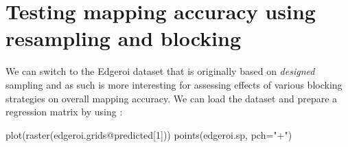 \documentclass[
  graybox,natbib,nospthms]{svmono}
\newenvironment{Shaded}{\begin{snugshade}}{\end{snugshade}}
\newcommand{\AttributeTok}[1]{\textcolor[rgb]{0.61,0.61,0.61}{#1}}
\newcommand{\CommentTok}[1]{\textcolor[rgb]{0.37,0.37,0.37}{\textit{#1}}}
\newcommand{\DecValTok}[1]{\textcolor[rgb]{0.06,0.06,0.06}{#1}}
\newcommand{\ErrorTok}[1]{\textcolor[rgb]{0.14,0.14,0.14}{\textbf{#1}}}
\newcommand{\FloatTok}[1]{\textcolor[rgb]{0.06,0.06,0.06}{#1}}
\newcommand{\FunctionTok}[1]{\textcolor[rgb]{0,0,0}{#1}}
\newcommand{\NormalTok}[1]{#1}
\newcommand{\OtherTok}[1]{\textcolor[rgb]{0.37,0.37,0.37}{#1}}
\newcommand{\SpecialCharTok}[1]{\textcolor[rgb]{0,0,0}{#1}}
\newcommand{\StringTok}[1]{\textcolor[rgb]{0.5,0.5,0.5}{#1}}
\begin{document}
\hypertarget{testing-mapping-accuracy-using-resampling-and-blocking}{%
\section{Testing mapping accuracy using resampling and blocking}\label{testing-mapping-accuracy-using-resampling-and-blocking}}

We can switch to the Edgeroi dataset \citep{malone2009mapping} that is originally
based on \emph{designed} sampling and as such is more interesting for assessing
effects of various blocking strategies on overall mapping accuracy. We can load
the dataset and prepare a regression matrix by using \citep{hengl2019predictive}:

\begin{Shaded}
\end{Shaded}

\begin{Shaded}
\begin{Highlighting}[]
\FunctionTok{plot}\NormalTok{(}\FunctionTok{raster}\NormalTok{(edgeroi.grids}\SpecialCharTok{@}\NormalTok{predicted[}\DecValTok{1}\NormalTok{]))}
\FunctionTok{points}\NormalTok{(edgeroi.sp, }\AttributeTok{pch=}\StringTok{"+"}\NormalTok{)}
\end{Highlighting}
\end{Shaded}
\end{document}

